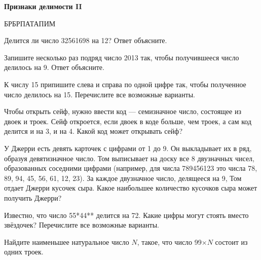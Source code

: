 \centerline{\bf \Huge Признаки делимости II}

\begin{flushright}
        \scriptsize{БРБРПАТАПИМ}
\end{flushright}

 Делится ли число 32561698 на 12? Ответ объясните.

 Запишите несколько раз подряд число 2013 так, чтобы получившееся число делилось на 9. Ответ объясните.

 К числу 15 припишите слева и справа по одной цифре так, чтобы полученное число делилось на 15. Перечислите все возможные варианты.

 Чтобы открыть сейф, нужно ввести код — семизначное число, состоящее из двоек и троек.
Сейф откроется, если двоек в коде больше, чем троек, а сам код делится и на 3, и на 4. Какой
код может открывать сейф?

 У Джерри есть девять карточек с цифрами от 1 до 9. Он выкладывает их в ряд, образуя девятизначное число. Том выписывает на доску все 8 двузначных
чисел, образованных соседними цифрами (например, для числа 789456123 это числа 78, 89, 94,
45, 56, 61, 12, 23). За каждое двузначное число, делящееся на 9, Том отдает Джерри кусочек
сыра. Какое наибольшее количество кусочков сыра может получить Джерри?

 Известно, что число 55*44** делится на 72. Какие цифры могут стоять вместо звёздочек? Перечислите все возможные варианты.

 Найдите наименьшее натуральное число $N$, такое, что число 99$\times N$ состоит из одних троек.